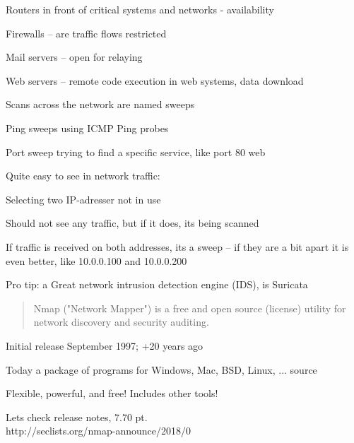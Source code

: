 \documentclass[Screen16to9,17pt]{foils}
\begin{document}


\begin{list2}
\item Routers in front of critical systems and networks - availability
\item Firewalls -- are traffic flows restricted
\item Mail servers -- open for relaying
\item Web servers -- remote code execution in web systems, data download
\end{list2}


\begin{list1}
\item Scans across the network are named sweeps
\item Ping sweeps using ICMP Ping probes
\item Port sweep trying to find a specific service, like port 80 web
\item Quite easy to see in network traffic:
\begin{list2}
\item Selecting two IP-adresser not in use
\item Should not see any traffic, but if it does, its being scanned
\item If traffic is received on both addresses, its a sweep -- if they are a bit apart it is even better, like 10.0.0.100 and 10.0.0.200
  \end{list2}

\vskip 2cm
Pro tip: a Great network intrusion detection engine (IDS), is Suricata 
\end{list1}

\begin{quote}
Nmap ("Network Mapper") is a free and open source (license) utility for network discovery and security auditing.
\end{quote}

\begin{list1}
\item Initial release September 1997; +20 years ago
\item Today a package of programs for Windows, Mac, BSD, Linux, ... source
\item Flexible, powerful, and free! Includes other tools!
\item Lets check release notes, 7.70 pt.\\
http://seclists.org/nmap-announce/2018/0
\end{list1}
\end{document}
